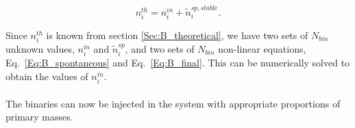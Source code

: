 \begin{equation}
\label{Eq:B_final}
n_i^{th} = n_i^{in} + \tilde{n}_{i}^{sp,stable} .
\end{equation}

Since $n_i^{th}$ is known from section \ref{Sec:B_theoretical}, we have two sets of $N_{bin}$ unknown values, $n_i^{in}$ and $\tilde{n}_i^{sp}$, and two sets of $N_{bin}$ non-linear equations, Eq.~\ref{Eq:B_spontaneous} and Eq.~\ref{Eq:B_final}. This can be numerically solved to obtain the values of $n_i^{in}$.

\paragraph*{}
The binaries can now be injected in the system with appropriate proportions of primary masses.




